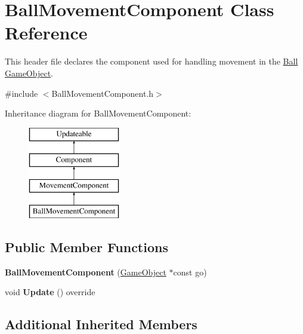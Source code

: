 \hypertarget{class_ball_movement_component}{}\section{Ball\+Movement\+Component Class Reference}
\label{class_ball_movement_component}


This header file declares the component used for handling movement in the \hyperlink{class_ball}{Ball} \hyperlink{class_game_object}{Game\+Object}.  




{\ttfamily \#include $<$Ball\+Movement\+Component.\+h$>$}

Inheritance diagram for Ball\+Movement\+Component\+:\begin{figure}[H]
\begin{center}
\leavevmode
\includegraphics[height=4.000000cm]{class_ball_movement_component}
\end{center}
\end{figure}
\subsection*{Public Member Functions}
\begin{DoxyCompactItemize}
\item 
\hypertarget{class_ball_movement_component_a49bff8098e0187712b8b0e176606c5b7}{}{\bfseries Ball\+Movement\+Component} (\hyperlink{class_game_object}{Game\+Object} $\ast$const go)\label{class_ball_movement_component_a49bff8098e0187712b8b0e176606c5b7}

\item 
\hypertarget{class_ball_movement_component_ab538dd44c8dd7cd0fc606bb579a67c71}{}void {\bfseries Update} () override\label{class_ball_movement_component_ab538dd44c8dd7cd0fc606bb579a67c71}

\end{DoxyCompactItemize}
\subsection*{Additional Inherited Members}


